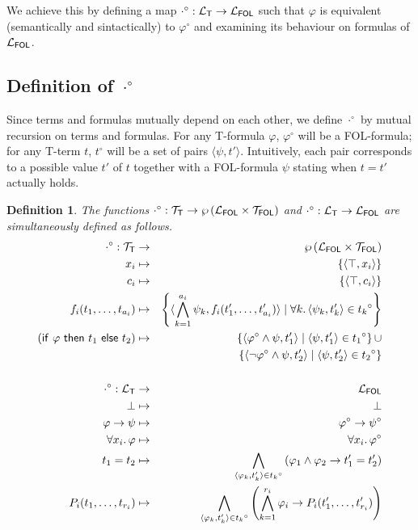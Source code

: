 \documentclass{article}
\newtheorem{definition}{Definition}[section]
\newcommand{\T}{\textsf T}
\newcommand{\FOL}{\textsf{FOL}}
\newcommand{\alt}{\mathrel{|}}
\newcommand{\ifthelse}[3]{\ensuremath{\mathsf{if}\ {#1}\ \mathsf{then}\ {#2}\ \mathsf{else}\ {#3}}}
\newcommand{\ofun}[1]{\ensuremath{{#1}^\circ}}
\newcommand{\omap}{\ofun\cdot}
\newcommand{\pair}[2]{\ensuremath{\langle{#1},{#2}\rangle}}
\newcommand{\lang}[1]{\ensuremath{{\cal L}_{\mathsf{#1}}}}
\newcommand{\terms}[1]{\ensuremath{{\cal T}_{\mathsf{#1}}}}
\def\sep{.\,}
\begin{document}
We achieve this by defining a map $\omap:\lang{T}\to\lang{FOL}$
such that $\varphi$ is equivalent (semantically and sintactically) to
$\ofun\varphi$ and examining its behaviour on formulas of {\lang{FOL}}.

\subsection{Definition of {\omap}}

Since terms and formulas mutually depend on each other, we define {\omap}
by mutual recursion on terms and formulas.
For any {\T}-formula $\varphi$, $\ofun\varphi$ will be a {\FOL}-formula;
for any {\T}-term $t$, $\ofun t$ will be a set of pairs {\pair\psi{t'}}.
Intuitively, each pair corresponds to a possible value $t'$ of $t$ together
with a {\FOL}-formula $\psi$ stating when $t=t'$ actually holds.

\begin{definition}\label{defn:omap} The functions
$\omap : \terms{T} \to \wp\left(\lang{FOL}\times\terms{FOL}\right)$ and
$\omap : \lang{T} \to \lang{FOL}$ are simultaneously defined as follows.
\begin{eqnarray*}
\omap : \terms{T} & \to & \wp\left(\lang{FOL}\times\terms{FOL}\right) \\
x_i & \mapsto & \{\pair\top{x_i}\} \\
c_i & \mapsto & \{\pair\top{c_i}\} \\
f_i(t_1,\ldots,t_{a_i}) & \mapsto &
 \left\{\pair{\bigwedge_{k=1}^{a_i} \psi_k}{f_i(t'_1,\ldots,t'_{a_i})}\alt
   \forall k\sep\pair{\psi_k}{t'_k}\in\ofun{t_k}\right\}\\
(\ifthelse\varphi{t_1}{t_2}) & \mapsto &
 \left\{\pair{\ofun\varphi\wedge\psi}{t'_1}\alt
   \pair\psi{t'_1}\in\ofun{t_1}\right\}\cup \\
 & & \ \ 
 \left\{\pair{\ofun{\neg\varphi}\wedge\psi}{t'_2}\alt
   \pair\psi{t'_2}\in\ofun{t_2}\right\} \\
\\
\omap : \lang{T} & \to & \lang{FOL} \\
\bot & \mapsto & \bot \\
\varphi\to\psi & \mapsto & \ofun\varphi\to\ofun\psi \\
\forall x_i\sep\varphi & \mapsto & \forall x_i\sep\ofun\varphi \\
t_1=t_2 & \mapsto & 
 \bigwedge_{\pair{\varphi_k}{t'_k}\in\ofun{t_k}}
 \left(\varphi_1\wedge\varphi_2\to t'_1=t'_2\right) \\
P_i(t_1,\ldots,t_{r_i})& \mapsto & 
 \bigwedge_{\pair{\varphi_k}{t'_k}\in\ofun{t_k}}
 \left(\bigwedge_{k=1}^{r_i}\varphi_i\to P_i(t'_1,\ldots,t'_{r_i})\right)
\end{eqnarray*}
\end{definition}
\end{document}
